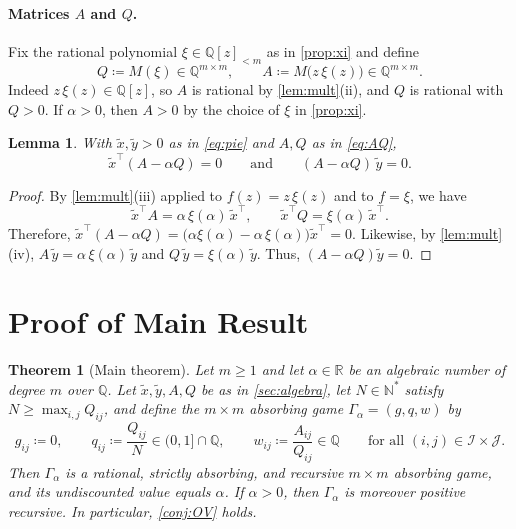\documentclass[11pt, a4paper]{article}
\theoremstyle{plain}
\newtheorem{theorem}{Theorem}
\newtheorem{lemma}{Lemma}
\theoremstyle{definition}
\newcommand{\Q}{\mathbb{Q}}
\newcommand{\R}{\mathbb{R}}
\newcommand{\N}{\mathbb{N}}
\newcommand{\PQ}{\Q[z]_{<m}}
\newcommand{\defas}{\coloneqq}
\newcommand{\I}{\mathcal{I}}
\newcommand{\J}{\mathcal{J}}
\begin{document}
\paragraph{Matrices $A$ and $Q$.} Fix the rational polynomial $\xi\in\PQ$ as in \cref{prop:xi} and define
\begin{equation}\label{eq:AQ}
Q\defas M(\xi)\in\Q^{m\times m},\qquad
A\defas M\bigl(z\,\xi(z)\bigr)\in\Q^{m\times m} .
\end{equation}
Indeed $z\,\xi(z)\in\Q[z]$, so $A$ is rational by \cref{lem:mult}(ii), and $Q$ is rational with $Q>0$. If $\alpha>0$, then $A>0$ by the choice of $\xi$ in \cref{prop:xi}.

\begin{lemma}\label{thm:nullvectors}
With $\tilde x,\tilde y>0$ as in \cref{eq:pie} and $A,Q$ as in \cref{eq:AQ},
\[
\tilde x^{\top}(A-\alpha Q)=0
\qquad\text{and}\qquad
(A-\alpha Q)\,\tilde y=0 .
\]
\end{lemma}

\begin{proof}
By \cref{lem:mult}(iii) applied to $f(z)=z\,\xi(z)$ and to $f=\xi$, we have
\[
\tilde x^{\top}A=\alpha\,\xi(\alpha)\,\tilde x^{\top},
\qquad
\tilde x^{\top}Q=\xi(\alpha)\,\tilde x^{\top}.
\]
Therefore, $\tilde x^{\top}(A-\alpha Q)=\bigl(\alpha\xi(\alpha)-\alpha\,\xi(\alpha)\bigr)\tilde x^{\top}=0$. Likewise, by \cref{lem:mult}(iv),
$A\,\tilde y=\alpha\,\xi(\alpha)\,\tilde y$ and $Q\,\tilde y=\xi(\alpha)\,\tilde y$. Thus, $(A-\alpha Q)\tilde y=0$.
\end{proof}


\section{Proof of Main Result}\label{sec:proof}

\begin{theorem}[Main theorem]\label{thm:main}
Let $m\geq1$ and let $\alpha\in\R$ be an algebraic number of degree $m$ over $\Q$. Let $\tilde x,\tilde y,A,Q$ be as in \cref{sec:algebra}, let $N\in\N^*$ satisfy $N\geq\max_{i,j}Q_{ij}$, and define the $m\times m$ absorbing game $\Gamma_\alpha=(g,q,w)$ by
\[
g_{ij}\defas 0,
\qquad
q_{ij}\defas \frac{Q_{ij}}{N}\in(0,1]\cap\Q,
\qquad
w_{ij}\defas \frac{A_{ij}}{Q_{ij}}\in\Q
\qquad
\text{for all }(i,j)\in \I\times\J .
\]
Then $\Gamma_\alpha$ is a rational, strictly absorbing, and recursive $m\times m$ absorbing game, and its undiscounted value equals $\alpha$. If $\alpha>0$, then $\Gamma_\alpha$ is moreover positive recursive. In particular, \cref{conj:OV} holds.
\end{theorem}
\end{document}
